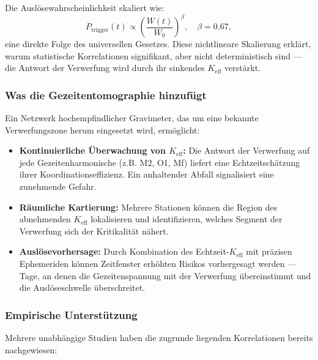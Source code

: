 \documentclass[12pt,a4paper]{article}
\theoremstyle{remark}
\begin{document}
	Die Auslösewahrscheinlichkeit skaliert wie:
	\[
	P_{\text{trigger}}(t) \propto \left( \frac{W(t)}{W_0} \right)^{\beta}, \quad \beta = 0.67,
	\]
	eine direkte Folge des universellen Gesetzes. Diese nichtlineare Skalierung erklärt, warum statistische Korrelationen signifikant, aber nicht deterministisch sind — die Antwort der Verwerfung wird durch ihr sinkendes \(K_{\mathrm{eff}}\) verstärkt.
	
	\subsubsection{Was die Gezeitentomographie hinzufügt}
	
	Ein Netzwerk hochempfindlicher Gravimeter, das um eine bekannte Verwerfungszone herum eingesetzt wird, ermöglicht:
	
	\begin{itemize}
		\item \textbf{Kontinuierliche Überwachung von \(K_{\mathrm{eff}}\):} Die Antwort der Verwerfung auf jede Gezeitenharmonische (z.B. M2, O1, Mf) liefert eine Echtzeitschätzung ihrer Koordinationseffizienz. Ein anhaltender Abfall signalisiert eine zunehmende Gefahr.
		\item \textbf{Räumliche Kartierung:} Mehrere Stationen können die Region des abnehmenden \(K_{\mathrm{eff}}\) lokalisieren und identifizieren, welches Segment der Verwerfung sich der Kritikalität nähert.
		\item \textbf{Auslösevorhersage:} Durch Kombination des Echtzeit-\(K_{\mathrm{eff}}\) mit präzisen Ephemeriden können Zeitfenster erhöhten Risikos vorhergesagt werden — Tage, an denen die Gezeitenspannung mit der Verwerfung übereinstimmt und die Auslöseschwelle überschreitet.
	\end{itemize}
	
	\subsubsection{Empirische Unterstützung}
	
	Mehrere unabhängige Studien haben die zugrunde liegenden Korrelationen bereits nachgewiesen:
	
\end{document}
